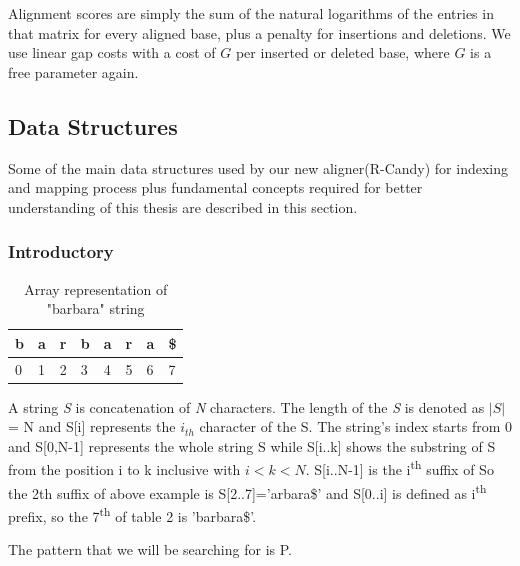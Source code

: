 \documentclass[11pt,a4paper]{report}
\begin{document}
Alignment scores are simply the sum of the natural logarithms of the
entries in that matrix for every aligned base, plus a penalty for
insertions and deletions.  We use linear gap costs with a cost of $G$
per inserted or deleted base, where $G$ is a free parameter again.



\subsection{Data Structures}  \label{Data Structures}

Some of the main data structures used by our new aligner(R-Candy) for indexing and mapping process plus fundamental concepts required for better understanding of this thesis are described in this section. 

\subsubsection{Introductory} \label{Introductory}

\begin{table}[h]
 \centering
  \begin{tabular}{ | p{0.5cm} | p{0.5cm} | p{0.5cm} |p{0.5cm} |p{0.5cm} |p{0.5cm} |p{0.5cm} |p{0.5cm} |}
    \hline
  \textbf{b} & \textbf{a } &\textbf{r}  &\textbf{b} &\textbf{a} &\textbf{r} &\textbf{a} &\textbf{\$}\\ \hline
       0 & 1 &2&3&4&5&6&7 \\ \hline
      
   \end{tabular}
\caption{Array representation of "barbara" string}
\label{Array-representation}
\end{table}



A string \emph{S} is concatenation of \emph{N} characters. 
The length of the \emph{S} is denoted as $\lvert S \rvert$ = N and S[i] represents the $i_{th}$ character of the S.
The string's index starts from 0 and S[0,N-1] represents the whole string S while S[i..k] shows the substring of S from the position i to k inclusive with $i < k < N$. 
S[i..N-1] is the i\textsuperscript{th} suffix of So the 2th suffix of above example is S[2..7]='arbara\$' and
 S[0..i] is defined as i\textsuperscript{th} prefix, so the 7\textsuperscript{th} of table 2 is 'barbara\$'.
 
The pattern that we will be searching for is P.
\end{document}

